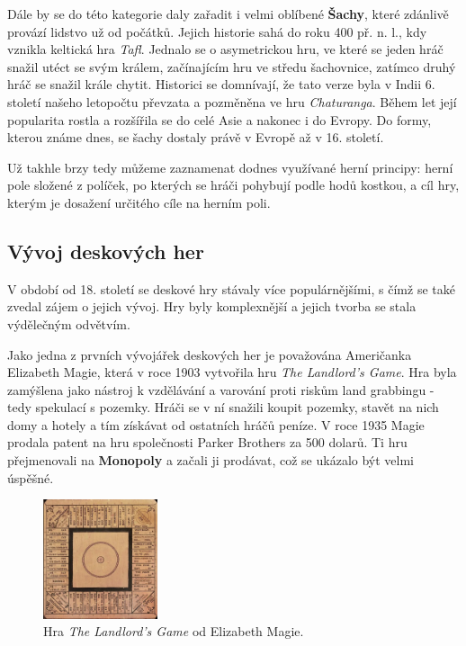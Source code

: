 Dále by se do této kategorie daly zařadit i velmi oblíbené \textbf{Šachy}, které zdánlivě provází lidstvo už od počátků. Jejich historie sahá do roku 400 př. n. l., kdy vznikla keltická hra \textit{Tafl}. Jednalo se o asymetrickou hru, ve které se jeden hráč snažil utéct se svým králem, začínajícím hru ve středu šachovnice, zatímco druhý hráč se snažil krále chytit. Historici se domnívají, že tato verze byla v Indii 6. století našeho letopočtu převzata a pozměněna ve hru \textit{Chaturanga}. Během let její popularita rostla a rozšířila se do celé Asie a nakonec i do Evropy. Do formy, kterou známe dnes, se šachy dostaly právě v Evropě až v 16. století. \cite{chess_com_2023}

Už takhle brzy tedy můžeme zaznamenat dodnes využívané herní principy: herní pole složené z políček, po kterých se hráči pohybují podle hodů kostkou, a cíl hry, kterým je dosažení určitého cíle na herním poli. \cite{attia_2018}

\subsection{Vývoj deskových her}
\label{subsec:development}

V období od 18. století se deskové hry stávaly více populárnějšími, s čímž se také zvedal zájem o jejich vývoj. Hry byly komplexnější a jejich tvorba se stala výdělečným odvětvím.

Jako jedna z prvních vývojářek deskových her je považována Američanka Elizabeth Magie, která v roce 1903 vytvořila hru \textit{The Landlord's Game}. Hra byla zamýšlena jako nástroj k vzdělávání a varování proti riskům land grabbingu - tedy spekulací s pozemky. Hráči se v ní snažili koupit pozemky, stavět na nich domy a hotely a tím získávat od ostatních hráčů peníze. V roce 1935 Magie prodala patent na hru společnosti Parker Brothers za 500 dolarů. Ti hru přejmenovali na \textbf{Monopoly} a začali ji prodávat, což se ukázalo být velmi úspěšné. \cite{attia_2018}

\begin{figure}[H]
    \centering
    \includegraphics[width=0.3\textwidth]{Figures/Theory/landlords-game.png}
    \caption{Hra \textit{The Landlord's Game} od Elizabeth Magie. \cite{attia_2018}}
    \label{fig:landlords-game}
\end{figure}

